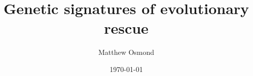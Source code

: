 \documentclass{beamer}
\title{Genetic signatures of evolutionary rescue}
\author{Matthew Osmond}
\institute{Department of Ecology and Evolutionary Biology\\ University of Toronto}
\date{\today}
\begin{document}

\begin{frame}
	\titlepage
\end{frame}



\end{document}
